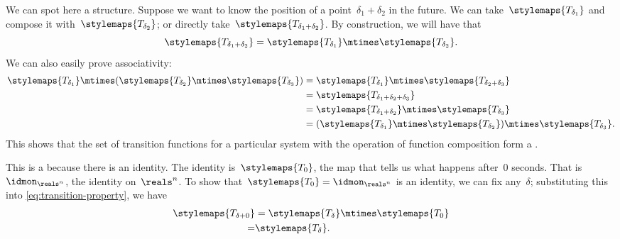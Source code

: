 We can spot here a  structure.
Suppose we want to know the position of a point~$\delta_1 + \delta_2$
in the future.
We can take~$\stylemaps{T_{\delta_1}}$ and compose it with~$\stylemaps{T_{\delta_2}}$; or directly take~$\stylemaps{T_{\delta_1 + \delta_2}}$.
By construction, we will have that
\begin{equation}
    \label{eq:transition-property}
    \stylemaps{T_{\delta_1 + \delta_2}} = \stylemaps{T_{\delta_1}} \mtimes \stylemaps{T_{\delta_2}}.
\end{equation}
We can also easily prove associativity:
\begin{equation}
    \begin{aligned}
        \stylemaps{T_{\delta_1}}\mtimes (\stylemaps{T_{\delta_2}}\mtimes \stylemaps{T_{\delta_3}}) & =\stylemaps{T_{\delta_1}}\mtimes \stylemaps{T_{\delta_2+\delta_3}} \\
                                                                                                   & =\stylemaps{T_{\delta_1+\delta_2+\delta_3}} \\
                                                                                                   & =\stylemaps{T_{\delta_1+\delta_2}}\mtimes \stylemaps{T_{\delta_3}} \\
                                                                                                   & =(\stylemaps{T_{\delta_1}}\mtimes \stylemaps{T_{\delta_2}})\mtimes \stylemaps{T_{\delta_3}}.
    \end{aligned}
\end{equation}
%
This shows that the set of transition functions for a particular system with the operation of function composition form a .

This  is a  because there is an identity.
The identity is~$\stylemaps{T_0}$, the map that tells us what happens after~$0$ seconds.
That is~$\idmon_{\reals^n}$, the identity on~$\reals^n$.
To show that~$\stylemaps{T_0} = \idmon_{\reals^n}$ is an identity, we can fix any~$\delta$; substituting this into \cref{eq:transition-property}, we have
\begin{equation}
    \begin{aligned}
        \stylemaps{T_{\delta + 0}} & = \stylemaps{T_{\delta}} \mtimes \stylemaps{T_{0}} \\
        =                          & \stylemaps{T_{\delta}}.
    \end{aligned}
\end{equation}


